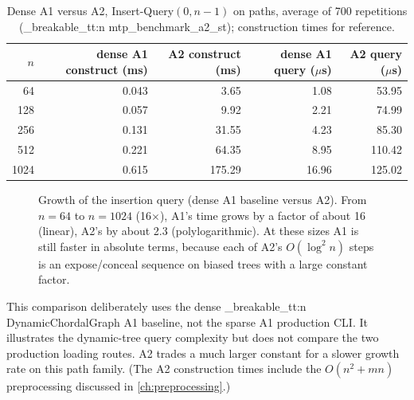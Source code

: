 \documentclass[11pt,a4paper,oneside]{report}
\theoremstyle{plain}
\theoremstyle{definition}
\theoremstyle{remark}
\newcommand{\op}[1]{\textsf{#1}}
\DeclareRobustCommand{\code}[1]{\mtp_breakable_tt:n {#1}}
\begin{document}
\begin{table}[ht]
\centering\small
\caption[Insert-Query on paths: dense A1 versus A2]{Dense A1 versus A2, \op{Insert-Query}\((0,n-1)\) on paths, average of
700 repetitions (\code{mtp_benchmark_a2_st}); construction times for reference.}\label{tab:a1-a2}
\begin{tabular}{@{}rrrrr@{}}
\toprule
\(n\) & dense A1 construct (ms) & A2 construct (ms) & dense A1 query (\(\mu\)s) & A2 query (\(\mu\)s)\\
\midrule
64 & 0.043 & 3.65 & 1.08 & 53.95\\
128 & 0.057 & 9.92 & 2.21 & 74.99\\
256 & 0.131 & 31.55 & 4.23 & 85.30\\
512 & 0.221 & 64.35 & 8.95 & 110.42\\
1024 & 0.615 & 175.29 & 16.96 & 125.02\\
\bottomrule
\end{tabular}
\end{table}

\begin{figure}[ht]
\centering
{}
\caption[Insert-Query growth: dense A1 versus A2]{Growth of the insertion query (dense A1 baseline versus A2). From \(n=64\) to
\(n=1024\) (16\(\times\)), A1's time grows by a factor of about 16 (linear), A2's by about 2.3
(polylogarithmic). At these sizes A1 is still faster in absolute terms, because each of A2's
\(O(\log^2 n)\) steps is an expose/conceal sequence on biased trees with a large constant
factor.}
\label{fig:a1-a2}
\end{figure}

This comparison deliberately uses the dense \code{DynamicChordalGraph} A1 baseline, not the sparse A1 production CLI. It illustrates the dynamic-tree query complexity but does not compare the two production loading routes. A2 trades a much larger constant for a slower growth rate on this path family.
(The A2 construction times include the \(O(n^2+mn)\) preprocessing discussed in
\cref{ch:preprocessing}.)
\end{document}

